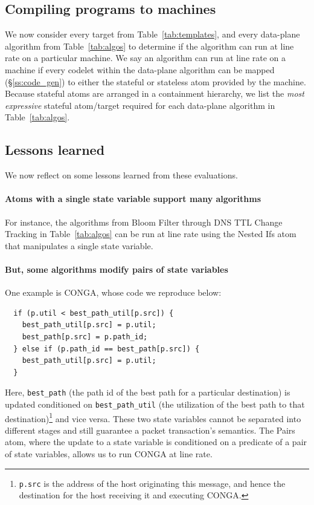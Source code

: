 \subsection{Compiling \pktlanguage programs to \absmachine machines}
\label{ss:compiler}
We now consider every target from Table~\ref{tab:templates}, and every
data-plane algorithm from Table~\ref{tab:algos} to determine if the algorithm
can run at line rate on a particular \absmachine machine. We say an algorithm
can run at line rate on a \absmachine machine if every codelet within the
data-plane algorithm can be mapped (\S\ref{ss:code_gen}) to either the stateful
or stateless atom provided by the \absmachine machine. Because stateful atoms
are arranged in a containment hierarchy, we list the \textit{most expressive}
stateful atom/target required for each data-plane algorithm in
Table~\ref{tab:algos}.

\subsection{Lessons learned}
We now reflect on some lessons learned from these evaluations.

\paragraph{Atoms with a single state variable support many algorithms}

For instance, the algorithms from Bloom Filter through DNS TTL Change Tracking
in Table~\ref{tab:algos} can be run at line rate using the Nested Ifs atom that
manipulates a single state variable.

\paragraph{But, some algorithms modify pairs of state variables}

One example is CONGA, whose code we reproduce below:
\begin{verbatim}
  if (p.util < best_path_util[p.src]) {
    best_path_util[p.src] = p.util;
    best_path[p.src] = p.path_id;
  } else if (p.path_id == best_path[p.src]) {
    best_path_util[p.src] = p.util;
  }
\end{verbatim}
Here, \texttt{best\_path} (the path id of the best path for a particular
destination) is updated conditioned on \texttt{best\_path\_util} (the
utilization of the best path to that destination)\footnote{{\tt p.src} is the
  address of the host originating this message, and hence the destination for
the host receiving it and executing CONGA.} and vice versa. These two state
variables cannot be separated into different stages and still guarantee a
packet transaction's semantics. The Pairs atom, where the update to a state
variable is conditioned on a predicate of a pair of state variables, allows us
to run CONGA at line rate.

